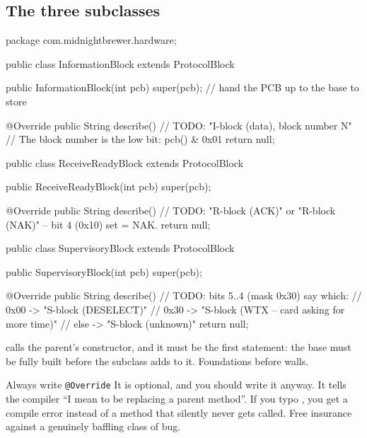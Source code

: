 \subsection{The three subclasses}

\begin{jcode}
package com.midnightbrewer.hardware;

public class InformationBlock extends ProtocolBlock {

    public InformationBlock(int pcb) {
        super(pcb);          // hand the PCB up to the base to store
    }

    @Override
    public String describe() {
        // TODO: "I-block (data), block number N"
        //       The block number is the low bit: pcb() & 0x01
        return null;
    }
}
\end{jcode}

\begin{jcode}
public class ReceiveReadyBlock extends ProtocolBlock {

    public ReceiveReadyBlock(int pcb) { super(pcb); }

    @Override
    public String describe() {
        // TODO: "R-block (ACK)" or "R-block (NAK)" -- bit 4 (0x10) set = NAK.
        return null;
    }
}
\end{jcode}

\begin{jcode}
public class SupervisoryBlock extends ProtocolBlock {

    public SupervisoryBlock(int pcb) { super(pcb); }

    @Override
    public String describe() {
        // TODO: bits 5..4 (mask 0x30) say which:
        //         0x00 -> "S-block (DESELECT)"
        //         0x30 -> "S-block (WTX -- card asking for more time)"
        //         else -> "S-block (unknown)"
        return null;
    }
}
\end{jcode}

 calls the parent's constructor, and it must be the first
statement: the base must be fully built before the subclass adds to it.
Foundations before walls.

\begin{concept}{Always write \texttt{@Override}}
It is optional, and you should write it anyway. It tells the compiler ``I mean
to be replacing a parent method''. If you typo , you get a
compile error instead of a method that silently never gets called. Free
insurance against a genuinely baffling class of bug.
\end{concept}


